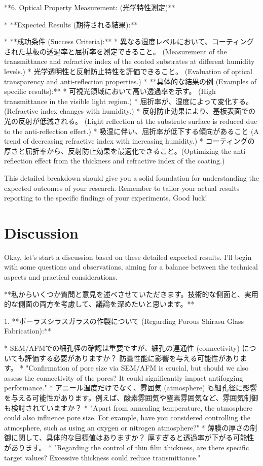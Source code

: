 \documentclass{article}
\begin{document}
**6. Optical Property Measurement: (光学特性測定)**

*   **Expected Results (期待される結果):**

    *   **成功条件 (Success Criteria):**
        *   異なる湿度レベルにおいて、コーティングされた基板の透過率と屈折率を測定できること。 (Measurement of the transmittance and refractive index of the coated substrates at different humidity levels.)
        *   光学透明性と反射防止特性を評価できること。 (Evaluation of optical transparency and anti-reflection properties.)
    *   **具体的な結果の例 (Examples of specific results):**
        *   可視光領域において高い透過率を示す。 (High transmittance in the visible light region.)
        *   屈折率が、湿度によって変化する。 (Refractive index changes with humidity.)
        *   反射防止効果により、基板表面での光の反射が低減される。 (Light reflection at the substrate surface is reduced due to the anti-reflection effect.)
        *   吸湿に伴い、屈折率が低下する傾向があること (A trend of decreasing refractive index with increasing humidity.)
        *   コーティングの厚さと屈折率から、反射防止効果を最適化できること。(Optimizing the anti-reflection effect from the thickness and refractive index of the coating.)

This detailed breakdown should give you a solid foundation for understanding the expected outcomes of your research. Remember to tailor your actual results reporting to the specific findings of your experiments. Good luck!


\section{Discussion}
Okay, let's start a discussion based on these detailed expected results.  I'll begin with some questions and observations, aiming for a balance between the technical aspects and practical considerations.

**私からいくつか質問と意見を述べさせていただきます。技術的な側面と、実用的な側面の両方を考慮して、議論を深めたいと思います。**

1. **ポーラスシラスガラスの作製について (Regarding Porous Shirasu Glass Fabrication):**

    *   SEM/AFMでの細孔径の確認は重要ですが、細孔の連通性 (connectivity) についても評価する必要がありますか？ 防曇性能に影響を与える可能性があります。
        *   "Confirmation of pore size via SEM/AFM is crucial, but should we also assess the connectivity of the pores? It could significantly impact antifogging performance."
    *   アニール温度だけでなく、雰囲気 (atmosphere) も細孔径に影響を与える可能性があります。例えば、酸素雰囲気や窒素雰囲気など、雰囲気制御も検討されていますか？
        *   "Apart from annealing temperature, the atmosphere could also influence pore size. For example, have you considered controlling the atmosphere, such as using an oxygen or nitrogen atmosphere?"
    *   薄膜の厚さの制御に関して、具体的な目標値はありますか？ 厚すぎると透過率が下がる可能性があります。
        *   "Regarding the control of thin film thickness, are there specific target values? Excessive thickness could reduce transmittance."
\end{document}
